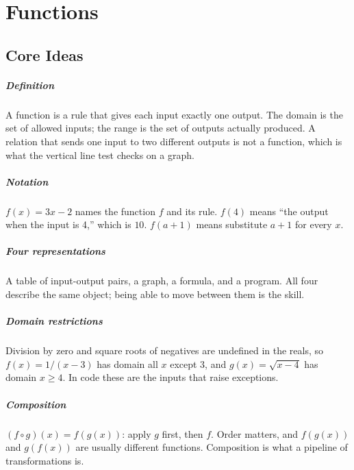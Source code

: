 \chapter{Functions}


\section{Core Ideas}

\paragraph{Definition} A function is a rule that gives each input exactly one output. The domain is the set of allowed inputs; the range is the set of outputs actually produced. A relation that sends one input to two different outputs is not a function, which is what the vertical line test checks on a graph.

\paragraph{Notation} $f(x) = 3x - 2$ names the function $f$ and its rule. $f(4)$ means ``the output when the input is 4,'' which is $10$. $f(a + 1)$ means substitute $a + 1$ for every $x$.

\paragraph{Four representations} A table of input-output pairs, a graph, a formula, and a program. All four describe the same object; being able to move between them is the skill.

\paragraph{Domain restrictions} Division by zero and square roots of negatives are undefined in the reals, so $f(x) = 1/(x - 3)$ has domain all $x$ except $3$, and $g(x) = \sqrt{x - 4}$ has domain $x \ge 4$. In code these are the inputs that raise exceptions.

\paragraph{Composition} $(f \circ g)(x) = f(g(x))$: apply $g$ first, then $f$. Order matters, and $f(g(x))$ and $g(f(x))$ are usually different functions. Composition is what a pipeline of transformations is.

